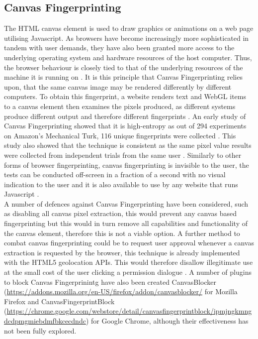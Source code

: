 \documentclass[12pt]{article}
\begin{document}
\subsection{Canvas Fingerprinting}
The HTML canvas element is used to draw graphics or animations on a web page utilising Javascript. As browsers have become increasingly more sophisticated in tandem with user demands, they have also been granted more access to the underlying operating system and hardware resources of the host computer. Thus, the browser behaviour is closely tied to that of the underlying resources of the machine it is running on \parencite{canvasFP}. It is this principle that Canvas Fingerprinting relies upon, that the same canvas image may be rendered differently by different computers. To obtain this fingerprint, a website renders text and WebGL items to a canvas element then examines the pixels produced, as different systems produce different output and therefore different fingerprints \parencite{canvasFP}. An early study of Canvas Fingerprinting showed that it is high-entropy as out of 294 experiments on Amazon's Mechanical Turk, 116 unique fingerprints were collected \parencite{canvasFP}. This study also showed that the technique is consistent as the same pixel value results were collected from independent trials from the same user \parencite{canvasFP}. Similarly to other forms of browser fingerprinting, canvas fingerprinting is invisible to the user, the tests can be conducted off-screen in a fraction of a second with no visual indication to the user and it is also available to use by any website that runs Javascript \parencite{canvasFP}. \\

A number of defences against Canvas Fingerprinting have been considered, such as disabling all canvas pixel extraction, this would prevent any canvas based fingerprinting but this would in turn remove all capabilities and functionality of the canvas element, therefore this is not a viable option. A further method to combat canvas fingerprinting could be to request user approval whenever a canvas extraction is requested by the browser, this technique is already implemented with the HTML5 geolocation APIs. This would therefore disallow illegitimate use at the small cost of the user clicking a permission dialogue \parencite{canvasFP}. A number of plugins to block Canvas Fingerprinintg have also been created CanvasBlocker (\url{https://addons.mozilla.org/en-US/firefox/addon/canvasblocker/} for Mozilla Firefox and CanvasFingerprintBlock (\url{https://chrome.google.com/webstore/detail/canvasfingerprintblock/ipmjngkmngdcdpmgmiebdmfbkcecdndc}) for Google Chrome, although their effectiveness has not been fully explored. \\  
\end{document}
